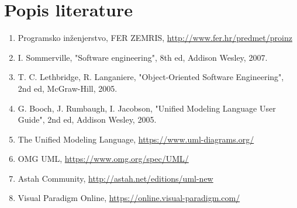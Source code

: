 \chapter*{Popis literature}
	 			
		
		\begin{enumerate}
			
			
			\item  Programsko inženjerstvo, FER ZEMRIS, \url{http://www.fer.hr/predmet/proinz}
			
			\item  I. Sommerville, "Software engineering", 8th ed, Addison Wesley, 2007.
			
			\item  T. C. Lethbridge, R. Langaniere, "Object-Oriented Software Engineering", 2nd ed, McGraw-Hill, 2005.
			
			\item  G. Booch, J. Rumbaugh, I. Jacobson, "Unified Modeling Language
User Guide", 2nd ed, Addison Wesley, 2005.		
			
			\item  The Unified Modeling Language, \url{https://www.uml-diagrams.org/}
			
			\item  OMG UML, \url{https://www.omg.org/spec/UML/}
			
			\item  Astah Community, \url{http://astah.net/editions/uml-new}
			
			\item  Visual Paradigm Online, \url{https://online.visual-paradigm.com/}
		\end{enumerate}
		
		 